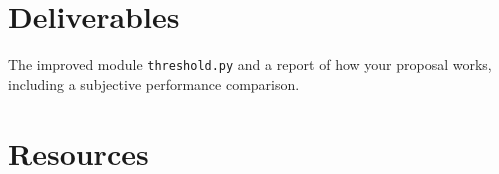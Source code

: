 \section{Deliverables}

The improved module \verb|threshold.py| and a report of how your proposal works,
including a subjective performance comparison.

\section{Resources}



